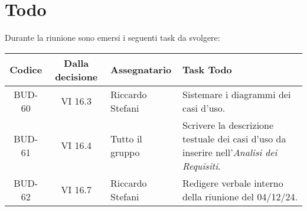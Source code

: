
\section{Todo}

Durante la riunione sono emersi i seguenti task da svolgere:

\vspace{0.5cm}

\begin{table}[htbp]
\centering
{}
\begin{tabular}{|c|c|p{}|p{}|}
    \hline
    \rowcolor[gray]{0.75}
    \textbf{Codice} & \textbf{Dalla decisione} & \textbf{Assegnatario} & \textbf{Task Todo} \\
    \hline
    BUD-60 & VI 16.3 & Riccardo Stefani & Sistemare i diagrammi dei casi d'uso. \\
    \hline
    BUD-61 & VI 16.4 & Tutto il gruppo & Scrivere la descrizione testuale dei casi d'uso da inserire nell'\emph{Analisi dei Requisiti}. \\
    \hline
    BUD-62 & VI 16.7 & Riccardo Stefani & Redigere verbale interno della riunione del 04/12/24. \\
    \hline
\end{tabular}
\end{table}